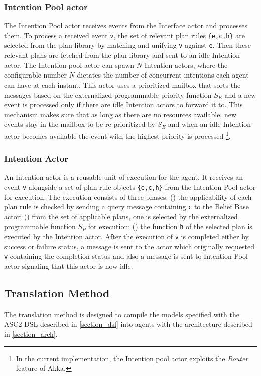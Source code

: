 \subsubsection{Intention Pool actor}
The Intention Pool actor receives events from the Interface actor and processes them. To process a received event \verb+v+, the set of relevant plan rules \verb+{e,c,h}+ are selected from the plan library by matching and unifying \verb+v+ against \verb+e+. Then these relevant plans are fetched from the plan library and sent to an idle Intention actor. The Intention pool actor can spawn $N$ Intention actors, where the configurable number $N$ dictates the number of concurrent intentions each agent can have at each instant. This actor uses a prioritized mailbox that sorts the messages based on the externalized programmable priority function $S_E$ and a new event is processed only if there are idle Intention actors to forward it to. This mechanism makes sure that as long as there are no resources available, new events stay in the mailbox to be re-prioritized by $S_E$ and when an idle Intention actor becomes available the event with the highest priority is processed \footnote{In the current implementation, the Intention pool actor exploits the \textit{Router} feature of Akka.}. %

\subsubsection{Intention Actor}
An Intention actor is a reusable unit of execution for the agent. It receives an event \verb+v+ alongside a set of plan rule objects \verb+{e,c,h}+ from the Intention Pool actor for execution. The execution consists of three phases: () the applicability of each plan rule is checked by sending a query message containing \verb+c+ to the Belief Base actor; () from the set of applicable plans, one is selected by the externalized programmable function $S_P$ for execution; () the function  \verb+h+ of the selected plan is executed by the Intention actor. After the execution of \verb+v+ is completed either by success or failure status, a message is sent to the actor which originally requested \verb+v+ containing the completion status and also a message is sent to Intention Pool actor signaling that this actor is now idle.


\subsection{Translation Method}
The translation method is designed to compile the models specified with the ASC2 DSL described in \ref{section_dsl} into agents with the architecture described in \ref{section_arch}. 

